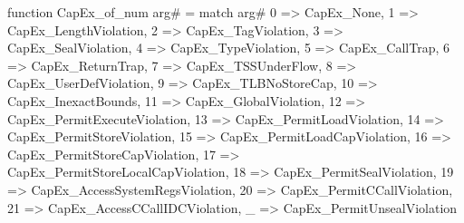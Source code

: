 function CapEx_of_num arg# = match arg# {
  0 => CapEx_None,
  1 => CapEx_LengthViolation,
  2 => CapEx_TagViolation,
  3 => CapEx_SealViolation,
  4 => CapEx_TypeViolation,
  5 => CapEx_CallTrap,
  6 => CapEx_ReturnTrap,
  7 => CapEx_TSSUnderFlow,
  8 => CapEx_UserDefViolation,
  9 => CapEx_TLBNoStoreCap,
  10 => CapEx_InexactBounds,
  11 => CapEx_GlobalViolation,
  12 => CapEx_PermitExecuteViolation,
  13 => CapEx_PermitLoadViolation,
  14 => CapEx_PermitStoreViolation,
  15 => CapEx_PermitLoadCapViolation,
  16 => CapEx_PermitStoreCapViolation,
  17 => CapEx_PermitStoreLocalCapViolation,
  18 => CapEx_PermitSealViolation,
  19 => CapEx_AccessSystemRegsViolation,
  20 => CapEx_PermitCCallViolation,
  21 => CapEx_AccessCCallIDCViolation,
  _ => CapEx_PermitUnsealViolation
}

